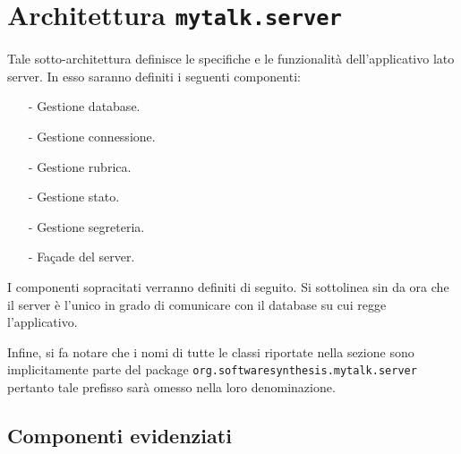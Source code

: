 \clearpage

\section{Architettura \texttt{mytalk.server}}\label{sec:server}
Tale sotto-architettura definisce le specifiche e le funzionalità dell'applicativo lato server. In esso saranno definiti i seguenti componenti:
\begin{itemize}[noitemsep,nolistsep]
	\item[-] Gestione database.
	\item[-] Gestione connessione.
	\item[-] Gestione rubrica.
	\item[-] Gestione stato.
	\item[-] Gestione segreteria.
	\item[-] Façade del server.
\end{itemize}

I componenti sopracitati verranno definiti di seguito. Si sottolinea sin da ora che il server è l'unico in grado di comunicare con il database su cui regge l'applicativo.

Infine, si fa notare che i nomi di tutte le classi riportate nella sezione sono implicitamente parte del package \texttt{org.softwaresynthesis.mytalk.server} pertanto tale prefisso sarà omesso nella loro denominazione.

\subsection{Componenti evidenziati}

